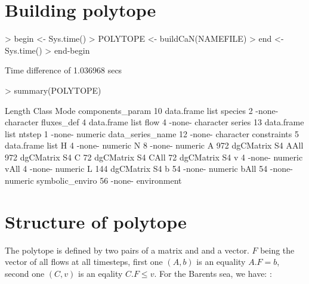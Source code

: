 \documentclass{article}
\begin{document}
\section{Building polytope}

\begin{Schunk}
\begin{Sinput}
> begin <- Sys.time()
> POLYTOPE <- buildCaN(NAMEFILE)
> end <- Sys.time()
> end-begin
\end{Sinput}
\begin{Soutput}
Time difference of 1.036968 secs
\end{Soutput}
\begin{Sinput}
> summary(POLYTOPE)
\end{Sinput}
\begin{Soutput}
                 Length Class      Mode       
components_param  10    data.frame list       
species            2    -none-     character  
fluxes_def         4    data.frame list       
flow               4    -none-     character  
series            13    data.frame list       
ntstep             1    -none-     numeric    
data_series_name  12    -none-     character  
constraints        5    data.frame list       
H                  4    -none-     numeric    
N                  8    -none-     numeric    
A                972    dgCMatrix  S4         
AAll             972    dgCMatrix  S4         
C                 72    dgCMatrix  S4         
CAll              72    dgCMatrix  S4         
v                  4    -none-     numeric    
vAll               4    -none-     numeric    
L                144    dgCMatrix  S4         
b                 54    -none-     numeric    
bAll              54    -none-     numeric    
symbolic_enviro   56    -none-     environment
\end{Soutput}
\end{Schunk}

\section{Structure of polytope}

The polytope is defined by two pairs of a matrix and and a vector. $F$ being the vector of all flows at all timesteps, first one $(A,b)$ is an equality $ A.F = b$, second one $(C,v)$ is an eqality  $ C.F \le v$. For the Barents sea, we have: :
\end{document}
